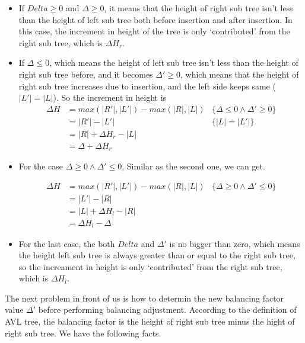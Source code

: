 \documentclass{article}
\begin{document}
\begin{itemize}
\item If $Delta \geq 0$ and $\Delta \geq 0$, it means that the height
of right sub tree isn't less than the height of left sub tree both
before insertion and after insertion. In this case, the increment in
height of the tree is only `contributed' from the right sub tree, which
is $\Delta H_r$.

\item If $\Delta \leq 0$, which means the height of left sub tree isn't
less than the height of right sub tree before, and it becomes 
$\Delta' \geq 0$,
which means that the height of right sub tree increases due to insertion, 
and the left side keeps same ($|L'|=|L|$). So the increment in height is
\[
\begin{array}{rll}
\Delta H & = max(|R'|, |L'|) - max (|R|, |L|) & \{\Delta \leq 0 \land \Delta' \geq 0 \}\\
         & = |R'|-|L'| & \{|L|=|L'| \}\\
         & = |R|+\Delta H_r - |L| & \\
         & = \Delta + \Delta H_r &
\end{array}
\]

\item For the case $\Delta \geq 0 \land \Delta' \leq 0$, Similar as the
second one, we can get.

\[
\begin{array}{rll}
\Delta H & = max(|R'|, |L'|) - max (|R|, |L|) & \{\Delta \geq 0 \land \Delta' \leq 0 \}\\
         & = |L'|-|R| & \\
         & = |L|+\Delta H_l - |R| & \\
         & = \Delta H_l - \Delta&
\end{array}
\]

\item For the last case, the both $Delta$ and $\Delta'$ is no bigger than
zero, which means the height left sub tree is always greater than or equal
 to the right sub tree, so the increament in height is only `contributed'
from the right sub tree, which is $\Delta H_l$.
\end{itemize}

The next problem in front of us is how to determin the new balancing
factor value $\Delta'$ before performing balancing adjustment.
According to the definition of AVL tree, the balancing factor is the
height of right sub tree minus the hight of right sub tree. We have
the following facts.
\end{document}
